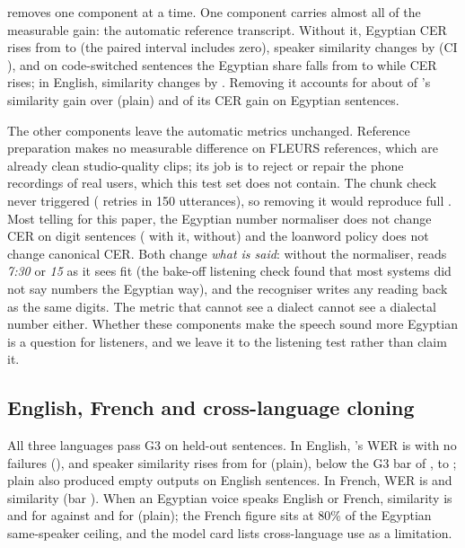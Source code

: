  removes one component at a time. One component carries almost all of the measurable gain: the
automatic reference transcript. Without it, Egyptian CER rises from  to
 (the paired interval includes zero), speaker similarity changes by
 (CI ), and on code-switched
sentences the Egyptian share falls from  to  while CER rises; in English,
similarity changes by . Removing it accounts for about 
of \BA's similarity gain over \vox (plain) and  of its CER gain on Egyptian sentences.

The other components leave the automatic metrics unchanged. Reference preparation makes no measurable difference on
FLEURS references, which are already clean studio-quality clips; its job is to reject or repair the phone recordings
of real users, which this test set does not contain. The chunk check never triggered ( retries
in 150 utterances), so removing it would reproduce full \BA. Most telling for this paper, the Egyptian number
normaliser does not change CER on digit sentences ( with it, 
without) and the loanword policy does not change canonical CER. Both change \emph{what is said}: without the
normaliser, \vox reads \emph{7:30} or \emph{15} as it sees fit (the bake-off listening check found that most systems did
not say numbers the Egyptian way), and the recogniser writes any reading back as the same digits. The metric that cannot see a dialect cannot see a dialectal number either. Whether
these components make the speech sound more Egyptian is a question for listeners, and we leave it to the listening
test rather than claim it.
\subsection{English, French and cross-language cloning}
All three languages pass G3 on held-out sentences. In English, \BA's WER is  with no failures
(), and speaker similarity rises from  for \vox (plain), below the G3 bar of
, to ; plain \vox also produced empty outputs on  English
sentences. In French, WER is  and similarity  (bar ). When an
Egyptian voice speaks English or French, similarity is  and  for \BA against
 and  for \vox (plain); the French figure sits at 80\% of the Egyptian
same-speaker ceiling, and the model card lists cross-language use as a limitation.

